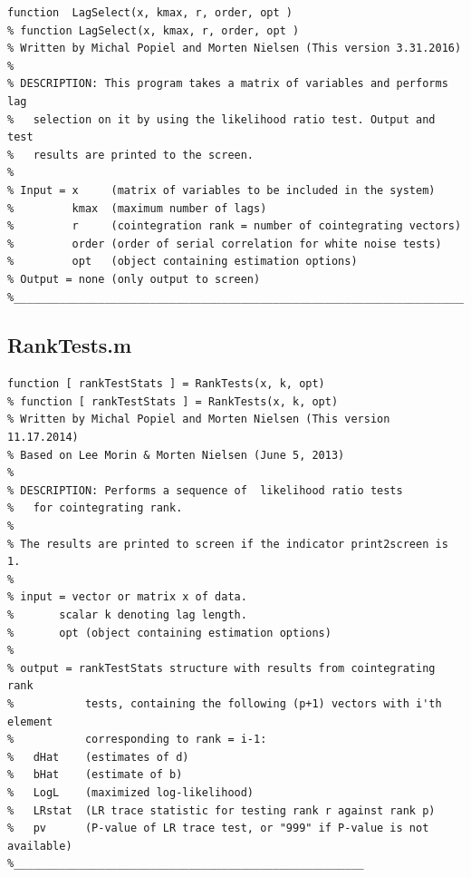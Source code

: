 \documentclass[10pt]{article}
\begin{document}
\begin{lstlisting}[frame=single,caption={LagSelect.m}]
function  LagSelect(x, kmax, r, order, opt )
% function LagSelect(x, kmax, r, order, opt )
% Written by Michal Popiel and Morten Nielsen (This version 3.31.2016)
% 
% DESCRIPTION: This program takes a matrix of variables and performs lag
% 	selection on it by using the likelihood ratio test. Output and test
% 	results are printed to the screen.
%
% Input = x     (matrix of variables to be included in the system)
%         kmax  (maximum number of lags)
%         r     (cointegration rank = number of cointegrating vectors)
%         order (order of serial correlation for white noise tests)
%         opt   (object containing estimation options)
% Output = none (only output to screen)
%_________________________________________________________________________
\end{lstlisting}


\subsection{RankTests.m}
\begin{lstlisting}[frame=single,caption={RankTests.m}]
function [ rankTestStats ] = RankTests(x, k, opt)
% function [ rankTestStats ] = RankTests(x, k, opt)
% Written by Michal Popiel and Morten Nielsen (This version 11.17.2014)
% Based on Lee Morin & Morten Nielsen (June 5, 2013)
%
% DESCRIPTION: Performs a sequence of  likelihood ratio tests 
% 	for cointegrating rank.
% 
% The results are printed to screen if the indicator print2screen is 1.
%
% input = vector or matrix x of data.
%       scalar k denoting lag length.
%       opt (object containing estimation options)
% 
% output = rankTestStats structure with results from cointegrating rank 
%           tests, containing the following (p+1) vectors with i'th element
%           corresponding to rank = i-1:
%	dHat	(estimates of d)
%	bHat	(estimate of b)
%	LogL	(maximized log-likelihood)
%	LRstat  (LR trace statistic for testing rank r against rank p)
%	pv      (P-value of LR trace test, or "999" if P-value is not available)
%______________________________________________________
\end{lstlisting}%
\end{document}
